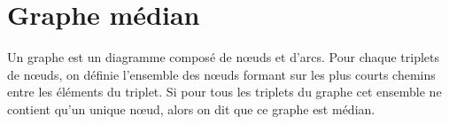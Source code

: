 \section{Graphe médian}

Un graphe est un diagramme composé de n\oe uds et d'arcs. Pour chaque triplets de n\oe uds, on définie l'ensemble des n\oe uds formant sur les plus courts chemins entre les éléments du triplet. Si pour tous les triplets du graphe cet ensemble ne contient qu'un unique n\oe ud, alors on dit que ce graphe est médian.